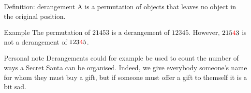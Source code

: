 \documentclass[a4paper]{article}
\begin{document}
\begin{parag}{Definition: derangement}
    A  is a permutation of objects that leaves no object in the original position.

    \begin{subparag}{Example}
        The permutation of $21453$ is a derangement of $12345$. However, $215{\color{red}4}3$ is not a derangement of $123{\color{red}4}5$.
    \end{subparag}

    \begin{subparag}{Personal note}
        Derangements could for example be used to count the number of ways a Secret Santa can be organised. Indeed, we give everybody someone's name for whom they must buy a gift, but if someone must offer a gift to themself it is a bit sad.
    \end{subparag}


\end{parag}
\end{document}
